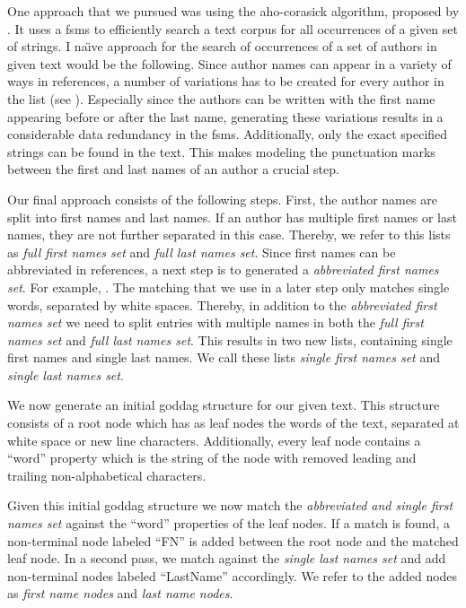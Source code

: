 One approach that we pursued was using the \gls{aho-corasick algorithm}, proposed by \citet{aho1975efficient}.
It uses a \glspl{fsm} to efficiently search a text corpus for all occurrences of a given set of strings.
I na{\"{\i}}ve approach for the search of occurrences of a set of authors in given text would be the following.
Since author names can appear in a variety of ways in references, a number of variations has to be created for every author in the list (see ).
Especially since the authors can be written with the first name appearing before or after the last name, generating these variations results in a considerable data redundancy in the \glspl{fsm}.
Additionally, only the exact specified strings can be found in the text.
This makes modeling the punctuation marks between the first and last names of an author a crucial step.

Our final approach consists of the following steps.
First, the author names are split into first names and last names.
If an author has multiple first names or last names, they are not further separated in this case.
Thereby, we refer to this lists as \textit{full first names set} and \textit{full last names set}.
Since first names can be abbreviated in references, a next step is to generated a \textit{abbreviated first names set}.
For example, .
The matching that we use in a later step only matches single words, separated by white spaces.
Thereby, in addition to the \textit{abbreviated first names set} we need to split entries with multiple names in both the \textit{full first names set} and \textit{full last names set}.
This results in two new lists, containing single first names and single last names.
We call these lists \textit{single first names set} and \textit{single last names set}.

We now generate an initial \gls{goddag} structure for our given text.
This structure consists of a root node which has as leaf nodes the words of the text, separated at white space or new line characters.
Additionally, every leaf node contains a ``word'' property which is the string of the node with removed leading and trailing non-alphabetical characters.

Given this initial \gls{goddag} structure we now match the \textit{abbreviated and single first names set} against the ``word'' properties of the leaf nodes.
If a match is found, a non-terminal node labeled ``FN'' is added between the root node and the matched leaf node.
In a second pass, we match against the \textit{single last names set} and add non-terminal nodes labeled ``LastName'' accordingly.
We refer to the added nodes as \textit{first name nodes} and \textit{last name nodes}.

